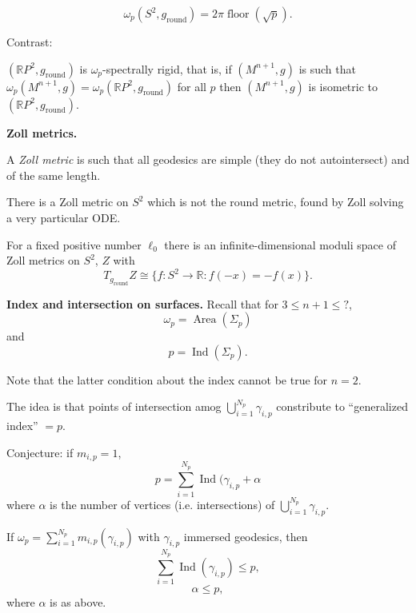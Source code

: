 \begin{theorem}[C-M]
\label{theorem-cm2}
$$
\omega_p(S^2,g_{\operatorname{round}})
=2\pi \operatorname{floor}(\sqrt{p}).
$$
\end{theorem}

\noindent
Contrast:
\begin{theorem}[Ambrosio-M-N]
\label{theorem-amn}
$(\mathbb{R}P^2,g_{\operatorname{round}})$
is $\omega_p$-spectrally rigid, that is,
if $(M^{n+1},g)$ is such that
$\omega_p(M^{n+1},g)=\omega_p(\mathbb{R}P^2,g_{\operatorname{round}})$
for all $p$ then
$(M^{n+1},g)$ is isometric to
$(\mathbb{R}P^2,g_{\operatorname{round}})$.
\end{theorem}

\medskip\noindent
{\bf Zoll metrics.}

 \begin{definition}
\label{definition-zoll-metric}
A {\it Zoll metric} is such
that all geodesics are simple 
(they do not autointersect) and of the
same length.
\end{definition}

\noindent
There is a Zoll metric on $S^2$ which is
not the round metric, found by Zoll
solving a very particular ODE.

\begin{theorem}[G-F]
\label{theorem-gf-moduli}
For a fixed positive number $\ell_0$
there is an infinite-dimensional moduli
space of Zoll metrics on $S^2$, $Z$
with
$$
T_{g_{\operatorname{round}}}Z
\cong
\{f:S^2 \to \mathbb{R}:
f(-x) = -f(x)\}.
$$
\end{theorem}

\medskip\noindent
{\bf Index and intersection on surfaces.}
Recall that for $3 \leq  n+1 \leq  ?$,
$$
\omega_p = \operatorname{Area}(\Sigma_p)
$$
and
$$
p = \operatorname{Ind}(\Sigma_p).
$$

Note that the latter condition about
the index cannot be true for $n=2$.

The idea is that points of intersection
amog $\bigcup_{i=1}^{N_p}\gamma_{i,p}$
constribute to ``generalized index'' $=p$.

Conjecture: if $m_{i,p}=1$,
$$
p=\sum_{i=1}^{N_p}\operatorname{Ind}(\gamma_{i,p}+
\alpha
$$
where $\alpha$ is the number of vertices
(i.e. intersections)
of $\bigcup_{i=1}^{N_p}\gamma_{i,p}$.

\begin{theorem}[MK-S-S]
\label{theorem-mkss}
If $\omega_p =
\sum_{i=1}^{N_p}m_{i,p}(\gamma_{i,p})$
with $\gamma_{i,p}$ immersed geodesics,
then
$$
\sum_{i=1}^{N_p}\operatorname{Ind}(\gamma_{i,p})
\leq p,
$$
$$
\alpha \leq  p,
$$
where $\alpha$ is as above.
\end{theorem}


